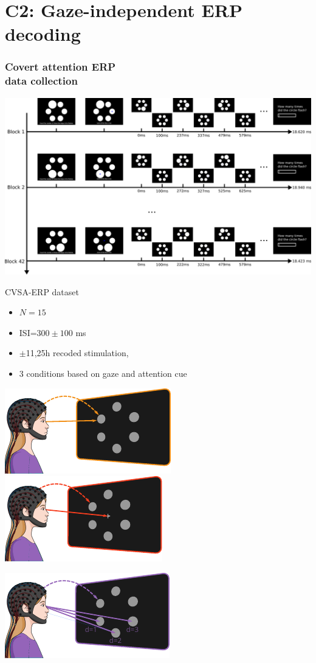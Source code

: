 \documentclass{kul-ulille-beamer}
\begin{document}
\section{\textbf{C2}: Gaze-independent ERP decoding}
\tocframe
\begin{frame}
  \frametitle{Covert attention ERP \\ data collection}
  \begin{minipage}{.45\textwidth}
    \includegraphics[width=\textwidth]{figures/covert/timeline.pdf}
  \end{minipage}\hfill%
  \begin{minipage}{.45\textwidth}
     CVSA-ERP dataset
     \begin{itemize}
       \item $N=15$
       \item ISI=$300\pm100$ ms
       \item $\pm$11,25h recoded stimulation,
       \item 3 conditions based on gaze and attention cue
     \end{itemize}

    \centering
    \includegraphics[width=.45\textwidth]{figures/covert/attention_overt.pdf}\hfill%
    \includegraphics[width=.45\textwidth]{figures/covert/attention_covert.pdf}%
    \bigskip

    \includegraphics[width=.45\textwidth]{figures/covert/attention_split.pdf}
  \end{minipage}
\end{frame}
\end{document}
